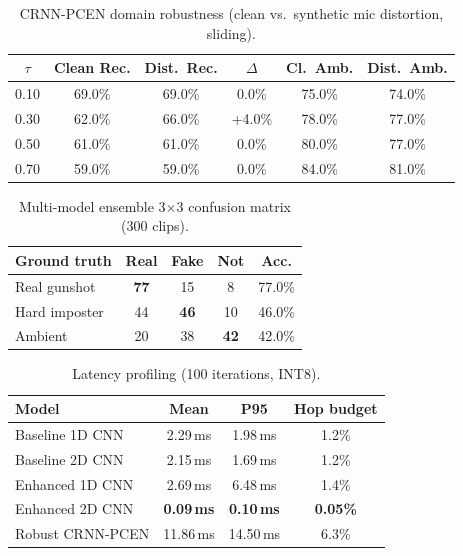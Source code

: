 \documentclass[conference]{IEEEtran}
\begin{document}
\begin{table}[t]
\centering
\caption{CRNN-PCEN domain robustness (clean vs.\ synthetic mic distortion, sliding).}
\label{tab:domain}
\small
\begin{tabular}{cccccc}
\toprule
$\tau$ & \textbf{Clean Rec.} & \textbf{Dist.\ Rec.} & $\Delta$ & \textbf{Cl.\ Amb.} & \textbf{Dist.\ Amb.} \\
\midrule
0.10 & 69.0\% & 69.0\% & 0.0\% & 75.0\% & 74.0\% \\
0.30 & 62.0\% & 66.0\% & +4.0\% & 78.0\% & 77.0\% \\
0.50 & 61.0\% & 61.0\% & 0.0\% & 80.0\% & 77.0\% \\
0.70 & 59.0\% & 59.0\% & 0.0\% & 84.0\% & 81.0\% \\
\bottomrule
\end{tabular}
\end{table}

\begin{table}[t]
\centering
\caption{Multi-model ensemble 3$\times$3 confusion matrix (300 clips).}
\label{tab:ensemble}
\small
\begin{tabular}{lcccc}
\toprule
\textbf{Ground truth} & \textbf{Real} & \textbf{Fake} & \textbf{Not} & \textbf{Acc.} \\
\midrule
Real gunshot & \textbf{77} & 15 & 8 & 77.0\% \\
Hard imposter & 44 & \textbf{46} & 10 & 46.0\% \\
Ambient & 20 & 38 & \textbf{42} & 42.0\% \\
\bottomrule
\end{tabular}
\end{table}

\begin{table}[t]
\centering
\caption{Latency profiling (100 iterations, INT8).}
\label{tab:latency}
\small
\begin{tabular}{lccc}
\toprule
\textbf{Model} & \textbf{Mean} & \textbf{P95} & \textbf{Hop budget} \\
\midrule
Baseline 1D CNN & 2.29\,ms & 1.98\,ms & 1.2\% \\
Baseline 2D CNN & 2.15\,ms & 1.69\,ms & 1.2\% \\
Enhanced 1D CNN & 2.69\,ms & 6.48\,ms & 1.4\% \\
Enhanced 2D CNN & \textbf{0.09\,ms} & \textbf{0.10\,ms} & \textbf{0.05\%} \\
Robust CRNN-PCEN & 11.86\,ms & 14.50\,ms & 6.3\% \\
\bottomrule
\end{tabular}
\end{table}
\end{document}
